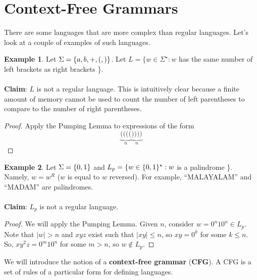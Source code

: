\documentclass[]{article}
\DeclarePairedDelimiter{\set}{\lbrace}{\rbrace}
\theoremstyle{definition}
\newtheorem{ex}{Example}[section]
\newcommand{\lecture}[1]{\marginpar{{\footnotesize $\leftarrow$ \underline{#1}}}}
\begin{document}
  \section{Context-Free Grammars} \lecture{October 15, 2013}
    There are some languages that are more complex than regular languages. Let's look at a couple of examples of such languages.

    \begin{ex}
      Let $\Sigma = \set{a, b, +, (, )}$. Let $L = \{ w  \in \Sigma^\star : w $ has the same number of left brackets as right brackets \}.
      \\ \\
      \textbf{Claim}: $L$ is not a regular language. This is intuitively clear because a finite amount of memory cannot be used to count the number of left parentheses to compare to the number of right parentheses.

      \begin{proof}
        Apply the Pumping Lemma to expressions of the form
        $$
          \underbrace{((((}_{n} \underbrace{))))}_{n}
        $$
      \end{proof}
    \end{ex}

    \begin{ex}
      Let $\Sigma = \set{0, 1}$ and $L_p = \{ w \in \set{0, 1}^\star : w $ is a palindrome \}. Namely, $w = w^R$ ($w$ is equal to $w$ reversed). For example, ``MALAYALAM'' and ``MADAM'' are palindromes.
      \\ \\
      \textbf{Claim}: $L_p$ is not a regular language.

      \begin{proof}
        We will apply the Pumping Lemma. Given $n$, consider $w = 0^n 1 0^n \in L_p$. Note that $|w| > n$ and $xyz$ exist such that $|xy| \le n$, so $xy = 0^k$ for some $k \le n$. So, $xy^2z = 0^m 1 0^n$ for some $m > n$, so $w \not \in L_p$.
      \end{proof}
    \end{ex}

    We will introduce the notion of a \textbf{context-free grammar} (\textbf{CFG}). A CFG is a set of rules of a particular form for defining languages.
\end{document}
